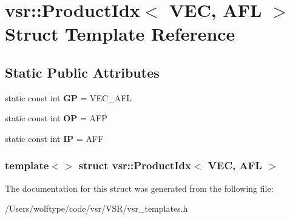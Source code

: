 \hypertarget{structvsr_1_1_product_idx_3_01_v_e_c_00_01_a_f_l_01_4}{\section{vsr\-:\-:Product\-Idx$<$ V\-E\-C, A\-F\-L $>$ Struct Template Reference}
\label{structvsr_1_1_product_idx_3_01_v_e_c_00_01_a_f_l_01_4}
}
\subsection*{Static Public Attributes}
\begin{DoxyCompactItemize}
\item 
\hypertarget{structvsr_1_1_product_idx_3_01_v_e_c_00_01_a_f_l_01_4_acb304411a7d70b25a330517e44fa06f3}{static const int {\bfseries G\-P} = V\-E\-C\-\_\-\-A\-F\-L}\label{structvsr_1_1_product_idx_3_01_v_e_c_00_01_a_f_l_01_4_acb304411a7d70b25a330517e44fa06f3}

\item 
\hypertarget{structvsr_1_1_product_idx_3_01_v_e_c_00_01_a_f_l_01_4_a93d7f5b6866a1679b698c875a3fbe634}{static const int {\bfseries O\-P} = A\-F\-P}\label{structvsr_1_1_product_idx_3_01_v_e_c_00_01_a_f_l_01_4_a93d7f5b6866a1679b698c875a3fbe634}

\item 
\hypertarget{structvsr_1_1_product_idx_3_01_v_e_c_00_01_a_f_l_01_4_a634c85b0e5120284949571b9dee4d79c}{static const int {\bfseries I\-P} = A\-F\-F}\label{structvsr_1_1_product_idx_3_01_v_e_c_00_01_a_f_l_01_4_a634c85b0e5120284949571b9dee4d79c}

\end{DoxyCompactItemize}
\subsubsection*{template$<$$>$ struct vsr\-::\-Product\-Idx$<$ V\-E\-C, A\-F\-L $>$}



The documentation for this struct was generated from the following file\-:\begin{DoxyCompactItemize}
\item 
/\-Users/wolftype/code/vsr/\-V\-S\-R/vsr\-\_\-templates.\-h\end{DoxyCompactItemize}
